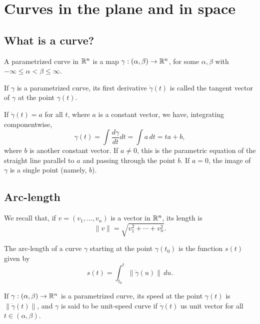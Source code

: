 \section{Curves in the plane and in space}

\subsection{What is a curve?}

\begin{defn}
  A parametrized curve in $\mathbb{R}^n$
  is a map $\gamma: (\alpha, \beta) \to \mathbb{R}^n$,
  for some $\alpha, \beta$ with $-\infty \leq \alpha < \beta \leq \infty$.
\end{defn}

\begin{defn}
  If $\gamma$ is a parametrized curve, its first derivative $\dot{\gamma}(t)$
  is called the tangent vector of $\gamma$ at the point $\gamma(t)$.
\end{defn}

\begin{proposition}
  If $\dot{\gamma}(t) = a$ for all $t$, where $a$ is a constant vector,
  we have, integrating componentwise,
  \[
    \gamma(t) = \int \frac{d\gamma}{dt} dt = \int a \, dt = ta + b,
  \]
  where $b$ is another constant vector.
  If $a \neq 0$, this is the parametric equation of the straight
  line parallel to $a$ and passing through the point $b$.
  If $a = 0$, the image of $\gamma$ is a single point (namely, $b$).
\end{proposition}

\subsection{Arc-length}

We recall that, if $v = (v_1, \dots, v_n)$ is a vector in $\mathbb{R}^n$, its length is
\[
    \|v\| = \sqrt{v_1^2 + \cdots + v_n^2}.
\]

\begin{defn}
  The arc-length of a curve $\gamma$ starting at the point $\gamma(t_0)$
  is the function $s(t)$ given by
  \[
    s(t) = \int_{t_0}^t \|\dot{\gamma}(u)\| \, du.
  \]
\end{defn}

\begin{defn}
  If $\gamma: (\alpha, \beta) \to \mathbb{R}^n$ is a parametrized curve,
  its speed at the point $\gamma(t)$ is $\|\dot{\gamma}(t)\|$,
  and $\gamma$ is said to be unit-speed curve if $\dot{\gamma}(t)$
  us unit vector for all $t \in (\alpha, \beta)$.
\end{defn}

